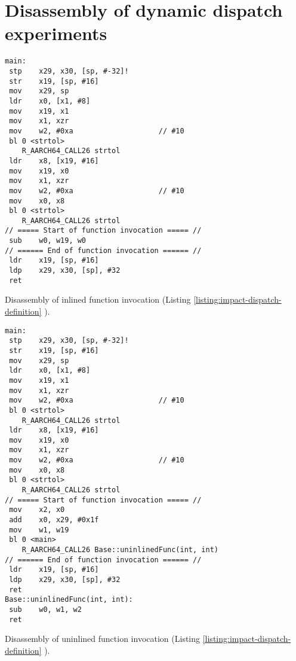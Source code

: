 \chapter{Disassembly of dynamic dispatch experiments}
\label{chap:impact-disassembly}


\vspace{2em}
\begin{code}
    \begin{verbatim}
main:
 stp	x29, x30, [sp, #-32]!
 str	x19, [sp, #16]
 mov	x29, sp
 ldr	x0, [x1, #8]
 mov	x19, x1
 mov	x1, xzr
 mov	w2, #0xa                   	// #10
 bl	0 <strtol>
    R_AARCH64_CALL26 strtol
 ldr	x8, [x19, #16]
 mov	x19, x0
 mov	x1, xzr
 mov	w2, #0xa                   	// #10
 mov	x0, x8
 bl	0 <strtol>
    R_AARCH64_CALL26 strtol
// ===== Start of function invocation ===== //
 sub	w0, w19, w0
// ====== End of function invocation ====== //
 ldr	x19, [sp, #16]
 ldp	x29, x30, [sp], #32
 ret
    \end{verbatim}
    \caption{Disassembly of inlined function invocation (Listing \ref{listing:impact-dispatch-definition} ).}
    \label{listing:impact-dispatch-inlined-disassembly}
\end{code}


\vspace{2em}
\begin{code}
    \begin{verbatim}
main:
 stp	x29, x30, [sp, #-32]!
 str	x19, [sp, #16]
 mov	x29, sp
 ldr	x0, [x1, #8]
 mov	x19, x1
 mov	x1, xzr
 mov	w2, #0xa                   	// #10
 bl	0 <strtol>
    R_AARCH64_CALL26 strtol
 ldr	x8, [x19, #16]
 mov	x19, x0
 mov	x1, xzr
 mov	w2, #0xa                   	// #10
 mov	x0, x8
 bl	0 <strtol>
    R_AARCH64_CALL26 strtol
// ===== Start of function invocation ===== //
 mov	x2, x0
 add	x0, x29, #0x1f
 mov	w1, w19
 bl	0 <main>
    R_AARCH64_CALL26 Base::uninlinedFunc(int, int)
// ====== End of function invocation ====== //
 ldr	x19, [sp, #16]
 ldp	x29, x30, [sp], #32
 ret
Base::uninlinedFunc(int, int):
 sub	w0, w1, w2
 ret
    \end{verbatim}
    \caption{Disassembly of uninlined function invocation (Listing \ref{listing:impact-dispatch-definition} ).}
    \label{listing:impact-dispatch-uninlined-disassembly}
\end{code}


